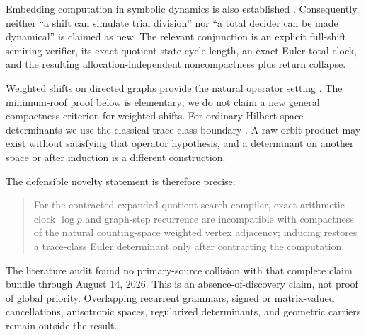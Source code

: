 Embedding computation in symbolic dynamics is also established
\citep{Kurka1997,DelvenneKurkaBlondel2006}.  Consequently, neither “a shift
can simulate trial division” nor “a total decider can be made dynamical” is
claimed as new.  The relevant conjunction is an explicit full-shift semiring
verifier, its exact quotient-state cycle length, an exact Euler total clock,
and the resulting allocation-independent noncompactness plus return collapse.

Weighted shifts on directed graphs provide the natural operator setting
\citep{JablonskiJungStochel2012}.  The minimum-roof proof below is elementary;
we do not claim a new general compactness criterion for weighted shifts.  For
ordinary Hilbert-space determinants we use the classical trace-class
boundary \citep{Grothendieck1956,Simon1977}.  A raw orbit product may exist
without satisfying that operator hypothesis, and a determinant on another
space or after induction is a different construction.

The defensible novelty statement is therefore precise:

\begin{quote}
For the contracted expanded quotient-search compiler, exact arithmetic clock
$\log p$ and graph-step recurrence are incompatible with compactness of the
natural counting-space weighted vertex adjacency; inducing restores a
trace-class Euler determinant only after contracting the computation.
\end{quote}

The literature audit found no primary-source collision with that complete
claim bundle through August 14, 2026.  This is an absence-of-discovery claim,
not proof of global priority.  Overlapping recurrent grammars, signed or
matrix-valued cancellations, anisotropic spaces, regularized determinants,
and geometric carriers remain outside the result.
